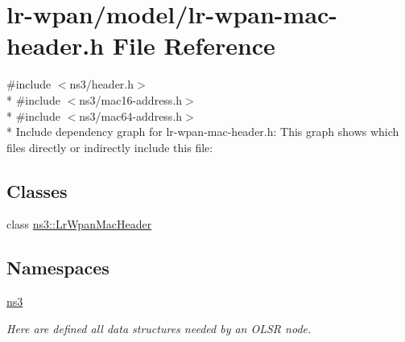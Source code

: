 \hypertarget{lr-wpan-mac-header_8h}{}\section{lr-\/wpan/model/lr-\/wpan-\/mac-\/header.h File Reference}
\label{lr-wpan-mac-header_8h}
{\ttfamily \#include $<$ns3/header.\+h$>$}\\*
{\ttfamily \#include $<$ns3/mac16-\/address.\+h$>$}\\*
{\ttfamily \#include $<$ns3/mac64-\/address.\+h$>$}\\*
Include dependency graph for lr-\/wpan-\/mac-\/header.h\+:
This graph shows which files directly or indirectly include this file\+:
\subsection*{Classes}
\begin{DoxyCompactItemize}
\item 
class \hyperlink{classns3_1_1LrWpanMacHeader}{ns3\+::\+Lr\+Wpan\+Mac\+Header}
\end{DoxyCompactItemize}
\subsection*{Namespaces}
\begin{DoxyCompactItemize}
\item 
 \hyperlink{namespacens3}{ns3}
\begin{DoxyCompactList}\small\item\em Here are defined all data structures needed by an O\+L\+SR node. \end{DoxyCompactList}\end{DoxyCompactItemize}
